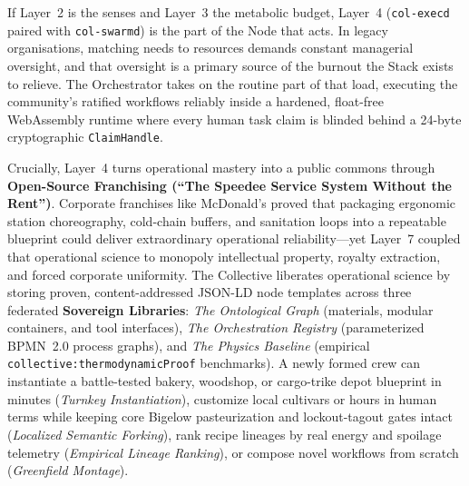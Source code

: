 If Layer~2 is the senses and Layer~3 the metabolic budget, Layer~4 (\texttt{col-execd} paired with \texttt{col-swarmd}) is the part of the Node that acts. In legacy organisations, matching needs to resources demands constant managerial oversight, and that oversight is a primary source of the burnout the Stack exists to relieve. The Orchestrator takes on the routine part of that load, executing the community's ratified workflows reliably inside a hardened, float-free WebAssembly runtime where every human task claim is blinded behind a 24-byte cryptographic \texttt{ClaimHandle}.

Crucially, Layer~4 turns operational mastery into a public commons through \textbf{Open-Source Franchising (``The Speedee Service System Without the Rent'')}. Corporate franchises like McDonald's proved that packaging ergonomic station choreography, cold-chain buffers, and sanitation loops into a repeatable blueprint could deliver extraordinary operational reliability---yet Layer~7 coupled that operational science to monopoly intellectual property, royalty extraction, and forced corporate uniformity. The Collective liberates operational science by storing proven, content-addressed JSON-LD node templates across three federated \textbf{Sovereign Libraries}: \textit{The Ontological Graph} (materials, modular containers, and tool interfaces), \textit{The Orchestration Registry} (parameterized BPMN~2.0 process graphs), and \textit{The Physics Baseline} (empirical \texttt{collective:thermodynamicProof} benchmarks). A newly formed crew can instantiate a battle-tested bakery, woodshop, or cargo-trike depot blueprint in minutes (\textit{Turnkey Instantiation}), customize local cultivars or hours in human terms while keeping core Bigelow pasteurization and lockout-tagout gates intact (\textit{Localized Semantic Forking}), rank recipe lineages by real energy and spoilage telemetry (\textit{Empirical Lineage Ranking}), or compose novel workflows from scratch (\textit{Greenfield Montage}).

